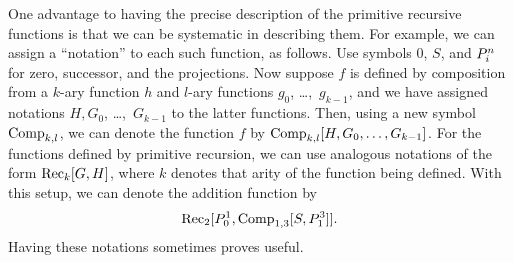 \documentclass[../../include/open-logic-section]{subfiles}
\begin{document}
\begin{explain}
One advantage to having the precise description of the primitive
recursive functions is that we can be systematic in describing them.
For example, we can assign a ``notation'' to each such function, as
follows. Use symbols $0$, $S$, and $P^{n}_{i}$ for zero, successor, and
the projections. Now suppose $f$ is defined by composition from a
$k$-ary function $h$ and $l$-ary functions $g_0$, \dots,~$g_{k-1}$, and
we have assigned notations $H,G_0$, \dots,~$G_{k-1}$ to the latter
functions. Then, using a new symbol $\mathrm{Comp}_{k,l}$, we can denote
the function $f$ by $\mathrm{Comp}_{k,l}[H,G_0,\dots,G_{k-1}]$. For the
functions defined by primitive recursion, we can use analogous
notations of the form $\mathrm{Rec}_k[G,H]$, where $k$ denotes that arity
of the function being defined. With this setup, we can denote the
addition function by
\[
\mathrm{Rec}_2[P^{1}_{0},\mathrm{Comp}_{1,3}[S,P^{3}_{1}]].
\]
Having these notations sometimes proves useful.
\end{explain}
\end{document}
